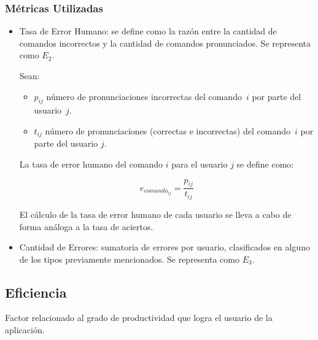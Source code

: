 \subsubsection{M\'etricas Utilizadas}
\begin{itemize}
	\item Tasa de Error Humano: se define como la raz\'on entre la cantidad de comandos incorrectos
	y la cantidad de comandos pronunciados. Se representa como $E_2$.
	
	Sean:

	\begin{itemize}
		\item $p_{ij}$ n\'umero de pronunciaciones incorrectas del \mbox{comando $i$} por parte del 
		\mbox{usuario $j$.}
		\item $t_{ij}$ n\'umero de pronunciaciones (correctas e incorrectas) del \mbox{comando $i$} por parte del usuario $j$.
	\end{itemize}
	La tasa de error humano del comando $i$ para el usuario $j$ se define como: 

	\begin{equation*}
		e_{{comando}_{ij}}=\frac{p_{ij}}{t_{ij}}
	\end{equation*}

	El c\'alculo de la tasa de error humano de cada usuario se lleva a cabo de forma an\'aloga 
	a la tasa de aciertos.

	\item Cantidad de Errores: sumatoria de errores por usuario, clasificados en
	alguno de los tipos previamente mencionados. Se representa como $E_3$.

\end{itemize}

\subsection{Eficiencia}
Factor relacionado al grado de productividad que logra el usuario de la aplicaci\'on.
